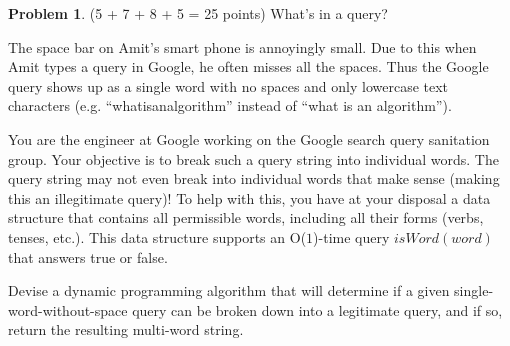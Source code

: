 \documentclass[11pt]{article}
\theoremstyle{definition}
\theoremstyle{theorem}
\newtheorem{prob}{Problem}
\begin{document}
\begin{prob}
(5 + 7 + 8 + 5 = 25 points) What's in a query?
\end{prob}

The space bar on Amit's smart phone is annoyingly small. Due to this when Amit types a query in Google, he often misses all the spaces. Thus the Google query shows up as a single word with no spaces and only lowercase text characters (e.g. ``whatisanalgorithm'' instead of ``what is an algorithm''). 

You are the engineer at Google working on the Google search query sanitation group. Your objective is to break such a query string into individual words. The query string may not even break into individual words that make sense (making this an illegitimate query)! To help with this, you have at your disposal a data structure that contains all permissible words, including all their forms (verbs, tenses, etc.). This data structure supports an O($1$)-time query $isWord(word)$ that answers true or false.

Devise a dynamic programming algorithm that will determine if a given single-word-without-space query can be broken down into a legitimate query, and if so, return the resulting multi-word string. 
\end{document}
